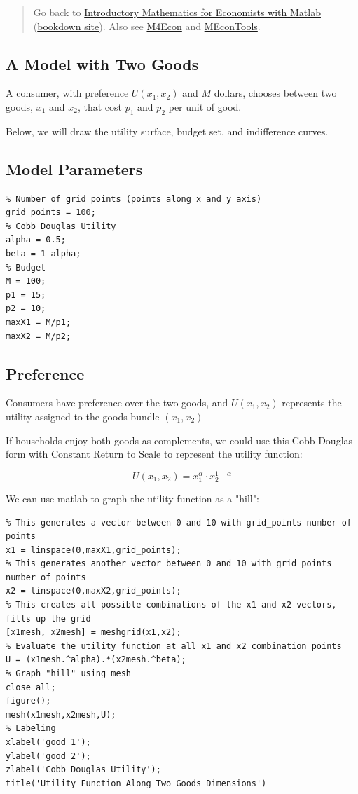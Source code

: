 \documentclass[
]{book}
\begin{document}
\begin{quote}
Go back to \href{https://math4econ.github.io/}{Introductory Mathematics for Economists with Matlab} (\href{https://math4econ.github.io/bookdown}{bookdown site}). Also see \href{http://fanwangecon.github.io/M4Econ}{M4Econ} and \href{https://fanwangecon.github.io/MEconTools/}{MEconTools}.
\end{quote}

\hypertarget{a-model-with-two-goods}{%
\subsection{A Model with Two Goods}\label{a-model-with-two-goods}}

A consumer, with preference \(U(x_1 ,x_2 )\) and \(M\) dollars, chooses
between two goods, \(x_1\) and \(x_2\), that cost \(p_1\) and \(p_2\) per unit
of good.

Below, we will draw the utility surface, budget set, and indifference
curves.

\hypertarget{model-parameters}{%
\subsection{Model Parameters}\label{model-parameters}}

\begin{verbatim}
% Number of grid points (points along x and y axis)
grid_points = 100;
% Cobb Douglas Utility
alpha = 0.5;
beta = 1-alpha;
% Budget
M = 100;
p1 = 15;
p2 = 10;
maxX1 = M/p1;
maxX2 = M/p2;
\end{verbatim}

\hypertarget{preference}{%
\subsection{Preference}\label{preference}}

Consumers have preference over the two goods, and \(U(x_1 ,x_2 )\)
represents the utility assigned to the goods bundle \((x_1 ,x_2 )\)

If households enjoy both goods as complements, we could use this
Cobb-Douglas form with Constant Return to Scale to represent the utility
function:

\[U(x_1 ,x_2 )=x_1^{\alpha } \cdot x_2^{1-\alpha }\]

We can use matlab to graph the utility function as a "hill":

\begin{verbatim}
% This generates a vector between 0 and 10 with grid_points number of points
x1 = linspace(0,maxX1,grid_points);
% This generates another vector between 0 and 10 with grid_points number of points
x2 = linspace(0,maxX2,grid_points);
% This creates all possible combinations of the x1 and x2 vectors, fills up the grid
[x1mesh, x2mesh] = meshgrid(x1,x2);
% Evaluate the utility function at all x1 and x2 combination points
U = (x1mesh.^alpha).*(x2mesh.^beta);
% Graph "hill" using mesh
close all;
figure();
mesh(x1mesh,x2mesh,U);
% Labeling
xlabel('good 1');
ylabel('good 2');
zlabel('Cobb Douglas Utility');
title('Utility Function Along Two Goods Dimensions')
\end{verbatim}
\end{document}
